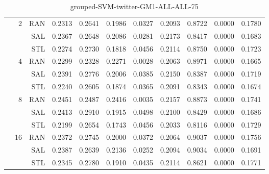 \begin{center}
\begin{table}[htbp]
\begin{center}
\begin{tabular}{ | r | r | r | r | r | r | r | r | r | r | r |}
 & \multirow{3}{*}{2} & RAN & 0.2313 & 0.2641 & 0.1986 & 0.0327 & 0.2093 & 0.8722 & 0.0000 & 0.1780\\ \cline{3-11}
 &   & SAL & 0.2367 & 0.2648 & 0.2086 & 0.0281 & 0.2173 & 0.8417 & 0.0000 & 0.1683\\ \cline{3-11}
 &   & STL & 0.2274 & 0.2730 & 0.1818 & 0.0456 & 0.2114 & 0.8750 & 0.0000 & 0.1723\\ \cline{2-11}
 & \multirow{3}{*}{4} & RAN & 0.2299 & 0.2328 & 0.2271 & 0.0028 & 0.2063 & 0.8971 & 0.0000 & 0.1665\\ \cline{3-11}
 &   & SAL & 0.2391 & 0.2776 & 0.2006 & 0.0385 & 0.2150 & 0.8387 & 0.0000 & 0.1719\\ \cline{3-11}
 &   & STL & 0.2240 & 0.2605 & 0.1874 & 0.0365 & 0.2091 & 0.8343 & 0.0000 & 0.1674\\ \cline{2-11}
 & \multirow{3}{*}{8} & RAN & 0.2451 & 0.2487 & 0.2416 & 0.0035 & 0.2157 & 0.8873 & 0.0000 & 0.1741\\ \cline{3-11}
 &   & SAL & 0.2413 & 0.2910 & 0.1915 & 0.0498 & 0.2100 & 0.8429 & 0.0000 & 0.1686\\ \cline{3-11}
 &   & STL & 0.2199 & 0.2654 & 0.1743 & 0.0456 & 0.2033 & 0.8116 & 0.0000 & 0.1729\\ \cline{2-11}
 & \multirow{3}{*}{16} & RAN & 0.2372 & 0.2745 & 0.2000 & 0.0372 & 0.2064 & 0.9037 & 0.0000 & 0.1756\\ \cline{3-11}
 &   & SAL & 0.2387 & 0.2639 & 0.2136 & 0.0252 & 0.2094 & 0.9034 & 0.0000 & 0.1691\\ \cline{3-11}
 &   & STL & 0.2345 & 0.2780 & 0.1910 & 0.0435 & 0.2114 & 0.8621 & 0.0000 & 0.1771\\ \cline{2-11}
\hline
\end{tabular}
\caption{grouped-SVM-twitter-GM1-ALL-ALL-75}
\end{center}
 \end{table}
\end{center}

